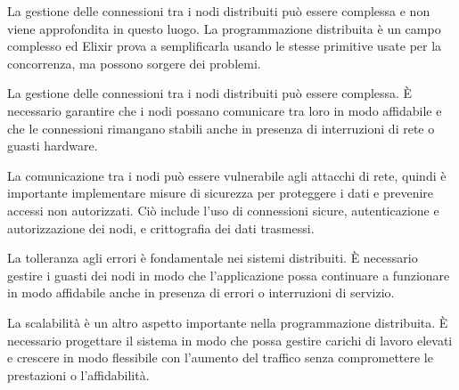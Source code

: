 La gestione delle connessioni tra i nodi distribuiti può
essere complessa e non viene approfondita in questo luogo.
La programmazione distribuita è un campo complesso ed Elixir
prova a semplificarla usando le stesse primitive usate per la
concorrenza, ma possono sorgere dei problemi.

La gestione delle connessioni tra i nodi distribuiti può
essere complessa.
È necessario garantire che i nodi possano comunicare
tra loro in modo affidabile e che le connessioni
rimangano stabili anche in presenza di interruzioni
di rete o guasti hardware.

La comunicazione tra i nodi può essere
vulnerabile agli attacchi di rete, quindi è importante
implementare misure di sicurezza per proteggere i dati
e prevenire accessi non autorizzati.
Ciò include l'uso di connessioni sicure, autenticazione
e autorizzazione dei nodi, e crittografia dei dati trasmessi.

La tolleranza agli errori è fondamentale nei sistemi distribuiti.
È necessario gestire i guasti dei nodi in modo che
l'applicazione possa continuare a funzionare in modo affidabile
anche in presenza di errori o interruzioni di servizio.

La scalabilità è un altro aspetto importante nella
programmazione distribuita.
È necessario progettare il sistema in modo che possa
gestire carichi di lavoro elevati e crescere in modo
flessibile con l'aumento del traffico senza compromettere
le prestazioni o l'affidabilità.


